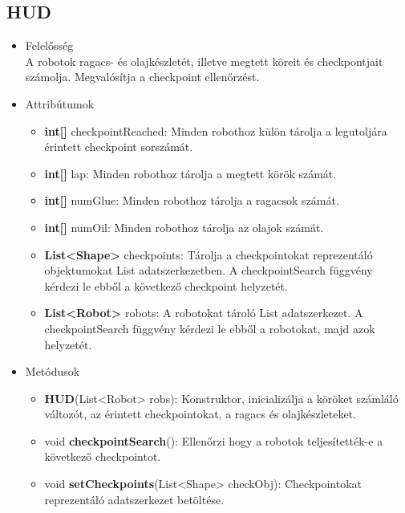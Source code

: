 \subsection{HUD}
\begin{itemize}
\item Felelősség\\
A robotok ragacs- és olajkészletét, illetve megtett köreit és checkpontjait számolja. Megvalósítja a checkpoint ellenőrzést.
\item Attribútumok
	\begin{itemize}
		\item \textbf{int[]} checkpointReached: Minden robothoz külön tárolja a legutoljára érintett checkpoint sorszámát.
		\item \textbf{int[]} lap: Minden robothoz tárolja a megtett körök számát. 
		\item \textbf{int[]} numGlue: Minden robothoz tárolja a ragacsok számát.
		\item \textbf{int[]} numOil: Minden robothoz tárolja az olajok számát.
		\item \textbf{List<Shape>} checkpoints: Tárolja a checkpointokat reprezentáló objektumokat List adatszerkezetben. A checkpointSearch függvény kérdezi le ebből a következő checkpoint helyzetét. 
		\item \textbf{List<Robot>} robots: A robotokat tároló List adatszerkezet. A checkpointSearch függvény kérdezi le ebből a robotokat, majd azok helyzetét.
	\end{itemize}
\item Metódusok
	\begin{itemize}
		\item \textbf{HUD}(List<Robot> robs): Konstruktor, inicializálja a köröket számláló változót, az érintett checkpointokat, a ragacs és olajkészleteket. 
		\item void \textbf{checkpointSearch}(): Ellenőrzi hogy a robotok teljesítették-e a következő checkpointot.
		\item void \textbf{setCheckpoints}(List<Shape> checkObj): Checkpointokat reprezentáló adatszerkezet betöltése.
		
	\end{itemize}
\end{itemize}

